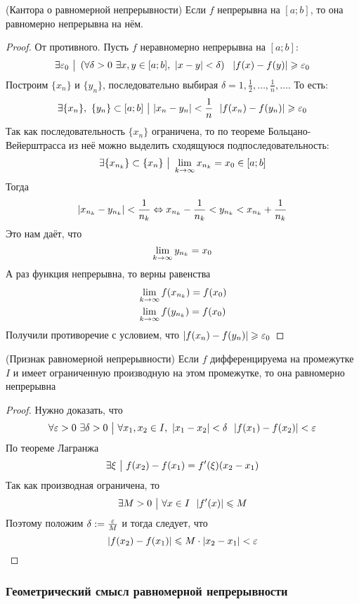 \begin{theorem} (Кантора о равномерной непрерывности)
	Если $f$ непрерывна на $[a; b]$, то она равномерно непрерывна на нём.
\end{theorem}

\begin{proof}
	От противного. Пусть $f$ неравномерно непрерывна на $[a; b]$:
	\[
		\exists \varepsilon_0 \ \big|\  \left(\forall \delta > 0\ \exists x, y \in [a; b],\ |x - y| < \delta\right)\ \ |f(x) - f(y)| \geqslant \varepsilon_0
	\]
	Построим $\{x_n\}$ и $\{y_n\}$, последовательно выбирая $\delta = 1, \frac{1}{2}, \ldots, \frac{1}{n}, \ldots$. То есть:
	\[
		\exists \{x_n\},\ \{y_n\} \subset [a; b] \ \big|\  |x_n - y_n| < \frac{1}{n}\ \ |f(x_n) - f(y_n)| \geqslant \varepsilon_0
	\]
	Так как последовательность $\{x_n\}$ ограничена, то по теореме Больцано-Вейерштрасса из неё можно выделить сходящуюся подпоследовательность:
	\[
		\exists \{x_{n_k}\} \subset \{x_n\} \ \big|\  \lim\limits_{k \to \infty} x_{n_k} = x_0 \in [a; b]
	\]
	Тогда
	\[
		|x_{n_k} - y_{n_k}| < \frac{1}{n_k} \Leftrightarrow x_{n_k} - \frac{1}{n_k} < y_{n_k} < x_{n_k} + \frac{1}{n_k}
	\]
	Это нам даёт, что
	\[
		\lim\limits_{k \to \infty} y_{n_k} = x_0
	\]
	А раз функция непрерывна, то верны равенства
	\begin{align*}
		&\lim\limits_{k \to \infty} f(x_{n_k}) = f(x_0)
		\\
		&\lim\limits_{k \to \infty} f(y_{n_k}) = f(x_0)
	\end{align*}
	Получили противоречие с условием, что $|f(x_n) - f(y_n)| \geqslant \varepsilon_0$
\end{proof}

\begin{theorem} (Признак равномерной непрерывности)
	Если $f$ дифференцируема на промежутке $I$ и имеет ограниченную производную на этом промежутке, то она равномерно непрерывна 
\end{theorem}

\begin{proof}
	Нужно доказать, что
	\[
		\forall \varepsilon > 0\ \exists \delta > 0 \ \big|\  \forall x_1, x_2 \in I,\ |x_1 - x_2| < \delta\ \ |f(x_1) - f(x_2)| < \varepsilon
	\]
	По теореме Лагранжа
	\[
		\exists \xi \ \big|\  f(x_2) - f(x_1) = f'(\xi)(x_2 - x_1)
	\]
	Так как производная ограничена, то
	\[
		\exists M > 0 \ \big|\  \forall x \in I\ \ |f'(x)| \leqslant M
	\]
	Поэтому положим $\delta := \frac{\varepsilon}{M}$ и тогда следует, что
	\[
		|f(x_2) - f(x_1)| \leqslant M \cdot |x_2 - x_1| < \varepsilon
	\]
\end{proof}

\subsubsection*{Геометрический смысл равномерной непрерывности}

